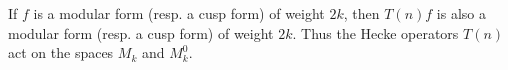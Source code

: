 If $f$ is a modular form (resp. a cusp form) of weight $2k$, then $T(n)f$ is also a modular form (resp. a cusp form) of weight $2k$. Thus the Hecke operators $T(n)$ act on the spaces $M_k$ and $M_k^0$.
